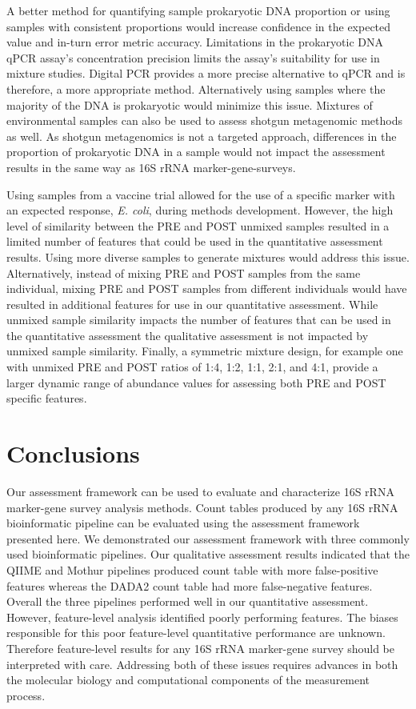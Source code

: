 \documentclass{bmcart}
\begin{document}
A better method for quantifying sample prokaryotic DNA proportion or
using samples with consistent proportions would increase confidence in
the expected value and in-turn error metric accuracy. Limitations in the
prokaryotic DNA qPCR assay's concentration precision limits the
assay's suitability for use in mixture studies. Digital PCR provides a
more precise alternative to qPCR and is therefore, a more appropriate
method. Alternatively using samples where the majority of the DNA is
prokaryotic would minimize this issue. Mixtures of environmental samples
can also be used to assess shotgun metagenomic methods as well. As
shotgun metagenomics is not a targeted approach, differences in the
proportion of prokaryotic DNA in a sample would not impact the
assessment results in the same way as 16S rRNA marker-gene-surveys.

Using samples from a vaccine trial allowed for the use of a specific
marker with an expected response, \emph{E. coli}, during methods
development. However, the high level of similarity between the PRE and POST unmixed
samples resulted in a limited number of features that could be used in
the quantitative assessment results. Using more diverse samples to
generate mixtures would address this issue.
Alternatively, instead of mixing PRE and POST samples from the same individual,
mixing PRE and POST samples from different individuals would
have resulted in additional features for use in our quantitative assessment.
While unmixed sample similarity impacts the number of features
that can be used in the quantitative assessment the qualitative
assessment is not impacted by unmixed sample similarity.
Finally, a symmetric mixture design, for example one with unmixed
PRE and POST ratios of 1:4, 1:2, 1:1, 2:1, and 4:1, provide a larger
dynamic range of abundance values for assessing both PRE and POST specific features.


\section*{Conclusions}
Our assessment framework can be used to evaluate and characterize 16S rRNA marker-gene survey analysis methods.
Count tables produced by any 16S rRNA bioinformatic pipeline can be evaluated using the assessment framework presented here.
We demonstrated our assessment framework with three commonly used bioinformatic pipelines.
Our qualitative assessment results indicated that the QIIME and Mothur pipelines produced count table with more false-positive features whereas the DADA2 count table had more false-negative features.
Overall the three pipelines performed well in our quantitative assessment. 
However, feature-level analysis identified poorly performing features.  
The biases responsible for this poor feature-level quantitative performance are unknown. 
Therefore feature-level results for any 16S rRNA marker-gene survey should be interpreted with care. 
Addressing both of these issues requires advances in both the molecular biology and
computational components of the measurement process.
\end{document}

